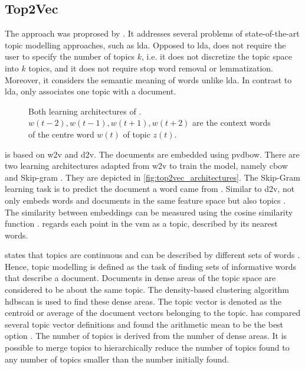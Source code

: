 \subsection{Top2Vec}\label{subsec:top2vec}

The approach \topTwovec{} was proprosed by \citeauthor{Top2Vec2020} \cite{Top2Vec2020}.
It addresses several problems of state-of-the-art topic modelling approaches, such as \ac{lda}.
Opposed to \ac{lda}, \topTwovec{} does not require the user to specify the number of topics $k$, 
i.e. it does not discretize the topic space into $k$ topics, 
and it does not require stop word removal or lemmatization.
Moreover, it considers the semantic meaning of words unlike \ac{lda}.
In contrast to \ac{lda}, \topTwovec{} only associates one topic with a document.

\begin{figure}%
    \centering
    \qquad
    \caption[Two learning architectures of \topTwovec{}]{Both learning architectures of \topTwovec{}.
    $w(t-2), w(t-1), w(t+1), w(t+2)$ are the context words of the centre word $w(t)$ of topic $z(t)$.
    }%
    \label{fig:top2vec_architectures}%
\end{figure}

\topTwovec{} is based on \ac{w2v} and \ac{d2v}.
The documents are embedded using \ac{pvdbow}.
There are two learning architectures adapted from \ac{w2v} to train the model, namely \ac{cbow} and Skip-gram \cite{Topic2Vec2015}.
They are depicted in \autoref{fig:top2vec_architectures}.
The Skip-Gram learning task is to predict the document a word came from \cite{Top2Vec2020, Topic2Vec2015}.
Similar to \ac{d2v}, \topTwovec{} not only embeds words and documents in the same feature space but also topics \cite{Top2Vec2020, Topic2Vec2015}.
The similarity between embeddings can be measured using the cosine similarity function \cite{Topic2Vec2015}.
\citeauthor{Top2Vec2020} regards each point in the \ac{vsm} as a topic, described by its nearest words.

\citeauthor{Top2Vec2020} states that topics are continuous and can be described by different sets of words \cite{Top2Vec2020}.
Hence, topic modelling is defined as the task of finding sets of informative words that describe a document.
Documents in dense areas of the topic space are considered to be about the same topic.
The density-based clustering algorithm \ac{hdbscan} is used to find these dense areas.
The topic vector is denoted as the centroid or average of the document vectors belonging to the topic.
\citeauthor{Top2Vec2020} has compared several topic vector definitions and found the arithmetic mean to be the best option \cite{Top2Vec2020}.
The number of topics is derived from the number of dense areas.
It is possible to merge topics to hierarchically reduce the number of topics found to any number of topics smaller than the number initially found.

